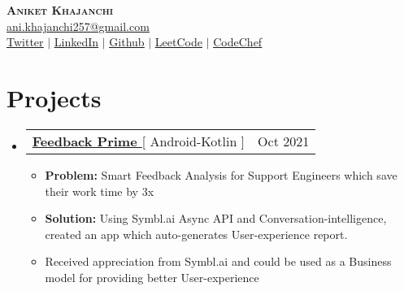 \documentclass[letterpaper,11pt]{article}
\makeatletter
\newcommand{\resumeItem}[1]{
  \item\small{
    {#1 \vspace{-2pt}}
  }
}
\newcommand{\resumeSubheading}[4]{
  \vspace{-2pt}\item
    \begin{tabular*}{0.97\textwidth}[t]{l@{\extracolsep{\fill}}r}
      \textbf{#1} & #2 \\
      \textit{\small#3} & \textit{\small #4} \\
    \end{tabular*}\vspace{-7pt}
}
\newcommand{\resumeSubSubheading}[2]{
    \item
    \begin{tabular*}{0.97\textwidth}{l@{\extracolsep{\fill}}r}
      \textit{\small#1} & \textit{\small #2} \\
    \end{tabular*}\vspace{-7pt}
}
\newcommand{\resumeProjectHeading}[2]{
    \item
    \begin{tabular*}{0.97\textwidth}{l@{\extracolsep{\fill}}r}
      \small#1 & #2 \\
    \end{tabular*}\vspace{-7pt}
}
\newcommand{\resumeSubHeadingListStart}{\begin{itemize}[leftmargin=0.15in, label={}]}
\newcommand{\resumeSubHeadingListEnd}{\end{itemize}}
\newcommand{\resumeItemListStart}{\begin{itemize}}
\newcommand{\resumeItemListEnd}{\end{itemize}\vspace{-5pt}}
\makeatother
\begin{document}

\begin{center}
    \textbf{\Huge \scshape Aniket Khajanchi} \\ \vspace{1pt}
    \href{mailto:ani.khajanchi257@gmail.com}{\color{blue}\underline{ani.khajanchi257@gmail.com}} \\ 
    \href{https://twitter.com/AniketKhajanchi}{\color{blue}\underline{Twitter}} $|$ 
    \href{https://linkedin.com/in/aniketkhajanchi}{\color{blue}\underline{LinkedIn}} $|$
    \href{https://github.com/aniketk13}{\color{blue}\underline{Github}} $|$
    \href{https://leetcode.com/aniketk13}{\color{blue}\underline{LeetCode}} $|$
    \href{https://codechef.com/users/aniketk13}{\color{blue}\underline{CodeChef}}
    
\end{center}


        
    




\section{Projects}
    \resumeSubHeadingListStart
      \resumeProjectHeading
          {\textbf{\href{https://github.com/aniketk13/Feedback-Prime}{\color{blue}Feedback Prime }}{[ Android-Kotlin ]}}{Oct 2021}
          \resumeItemListStart
           \resumeItem{\textbf{Problem:} Smart Feedback Analysis for Support Engineers which save their work time by 3x}
           \resumeItem{\textbf{Solution:} Using Symbl.ai Async API and Conversation-intelligence, created an app which auto-generates User-experience report.}
           \resumeItem{Received appreciation from Symbl.ai and could be used as a Business model for providing better User-experience}
          \resumeItemListEnd
    \resumeSubHeadingListEnd
    
\end{document}
